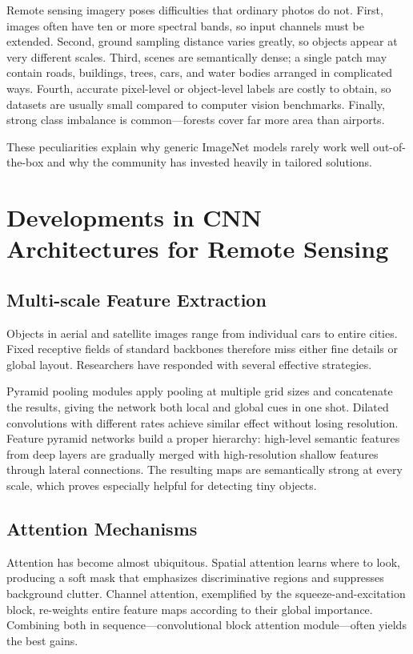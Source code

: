 \documentclass[12pt,a4paper]{article}
\begin{document}
Remote sensing imagery poses difficulties that ordinary photos do not. First, images often have ten or more spectral bands, so input channels must be extended. Second, ground sampling distance varies greatly, so objects appear at very different scales. Third, scenes are semantically dense; a single patch may contain roads, buildings, trees, cars, and water bodies arranged in complicated ways. Fourth, accurate pixel-level or object-level labels are costly to obtain, so datasets are usually small compared to computer vision benchmarks. Finally, strong class imbalance is common—forests cover far more area than airports.

These peculiarities explain why generic ImageNet models rarely work well out-of-the-box and why the community has invested heavily in tailored solutions.

\section{Developments in CNN Architectures for Remote Sensing}
\label{sec:developments}

\subsection{Multi-scale Feature Extraction}

Objects in aerial and satellite images range from individual cars to entire cities. Fixed receptive fields of standard backbones therefore miss either fine details or global layout. Researchers have responded with several effective strategies.

Pyramid pooling modules apply pooling at multiple grid sizes and concatenate the results, giving the network both local and global cues in one shot. Dilated convolutions with different rates achieve similar effect without losing resolution. Feature pyramid networks build a proper hierarchy: high-level semantic features from deep layers are gradually merged with high-resolution shallow features through lateral connections. The resulting maps are semantically strong at every scale, which proves especially helpful for detecting tiny objects.

\subsection{Attention Mechanisms}

Attention has become almost ubiquitous. Spatial attention learns where to look, producing a soft mask that emphasizes discriminative regions and suppresses background clutter. Channel attention, exemplified by the squeeze-and-excitation block, re-weights entire feature maps according to their global importance. Combining both in sequence—convolutional block attention module—often yields the best gains.
\end{document}
